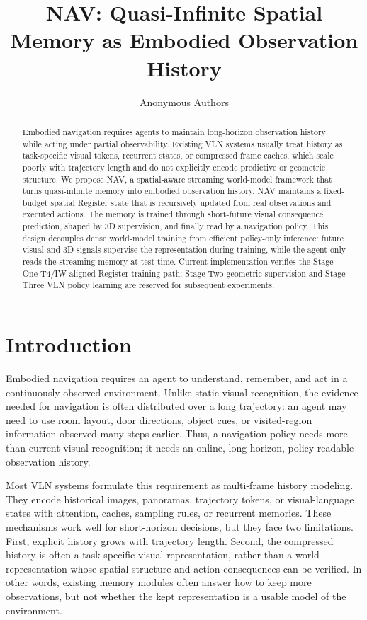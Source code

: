 \documentclass[11pt,a4paper]{ctexart}
\title{NAV: Quasi-Infinite Spatial Memory as Embodied Observation History}
\author{Anonymous Authors}
\date{}
\newcommand{\method}{NAV}
\begin{document}
\maketitle

\begin{abstract}
Embodied navigation requires agents to maintain long-horizon observation history while acting under partial observability. Existing VLN systems usually treat history as task-specific visual tokens, recurrent states, or compressed frame caches, which scale poorly with trajectory length and do not explicitly encode predictive or geometric structure. We propose \method, a spatial-aware streaming world-model framework that turns quasi-infinite memory into embodied observation history. \method{} maintains a fixed-budget spatial Register state that is recursively updated from real observations and executed actions. The memory is trained through short-future visual consequence prediction, shaped by 3D supervision, and finally read by a navigation policy. This design decouples dense world-model training from efficient policy-only inference: future visual and 3D signals supervise the representation during training, while the agent only reads the streaming memory at test time. Current implementation verifies the Stage-One T4/IW-aligned Register training path; Stage Two geometric supervision and Stage Three VLN policy learning are reserved for subsequent experiments.
\end{abstract}

\section{Introduction}

Embodied navigation requires an agent to understand, remember, and act in a continuously observed environment. Unlike static visual recognition, the evidence needed for navigation is often distributed over a long trajectory: an agent may need to use room layout, door directions, object cues, or visited-region information observed many steps earlier. Thus, a navigation policy needs more than current visual recognition; it needs an online, long-horizon, policy-readable observation history.

Most VLN systems formulate this requirement as multi-frame history modeling. They encode historical images, panoramas, trajectory tokens, or visual-language states with attention, caches, sampling rules, or recurrent memories. These mechanisms work well for short-horizon decisions, but they face two limitations. First, explicit history grows with trajectory length. Second, the compressed history is often a task-specific visual representation, rather than a world representation whose spatial structure and action consequences can be verified. In other words, existing memory modules often answer how to keep more observations, but not whether the kept representation is a usable model of the environment.
\end{document}
